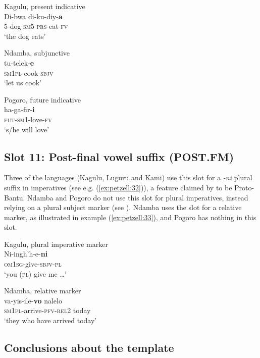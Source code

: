 \documentclass[output=paper,
            colorlinks, citecolor=brown
            ,draftmode
		  ]{langscibook}
\begin{document}
\ea\label{ex:petzell:29}Kagulu, present indicative\\
\gll Di-bwa  di-ku-diy-\textbf{a}  \\
5-dog  \textsc{sm}5-\textsc{prs}{}-eat-\textsc{{fv}}\\
\glt `the dog eats'


\ex\label{ex:petzell:30}Ndamba, subjunctive\\
\gll tu-telek-\textbf{e} \\
\textsc{sm}1\textsc{pl}{}-cook-\textsc{{sbjv}}\\
\glt `let us cook'


\ex\label{ex:petzell:31}Pogoro, future indicative\\
\gll ha-ga-fir-\textbf{i}   \\
\textsc{fut}{}-\textsc{sm1}{}-love-\textsc{{fv}}\\
\glt `s/he will love'
\z

\subsection{Slot 11: Post-final vowel suffix (POST.FM)}\label{sec:petzell:2.11}

Three of the languages (Kagulu, Luguru and Kami) use this slot for a \textit{{}-ni} plural suffix in imperatives (see e.g.  (\ref{ex:petzell:32})), a feature claimed by \citet[111]{Meeussen1967} to be Proto-Bantu. Ndamba and Pogoro do not use this slot for plural imperatives, instead relying on a plural subject marker (see ). Ndamba uses the slot for a relative marker, as illustrated in example (\ref{ex:petzell:33}), and Pogoro has nothing in this slot.


\ea\label{ex:petzell:32}Kagulu, plural imperative marker\\
\gll Ni-ingh'h-e-\textbf{ni} \\
\textsc{om}1\textsc{sg}{}-give-\textsc{sbjv}{}-\textsc{{pl}}\\
\glt `you (\textsc{pl}) give me \ldots'


\ex\label{ex:petzell:33}Ndamba, relative marker\\
\gll va-yis-ile-\textbf{vo}          nalelo \\
\textsc{sm}1\textsc{pl}{}-arrive-\textsc{pfv}{}-\textsc{{rel}}{2}    today\\
\glt `they who have arrived today'
\z

\subsection{Conclusions about the template}\label{sec:petzell:2.12}
\end{document}
